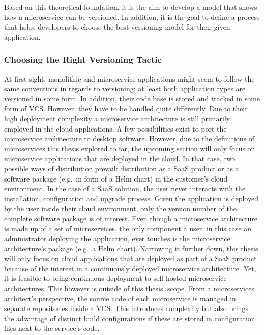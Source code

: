 Based on this theoretical foundation, it is the aim to develop a model that
shows how a microservice can be versioned. In addition, it is the goal to
define a process that helps developers to choose the best versioning model for
their given application.

\subsubsection{Choosing the Right Versioning Tactic}%
\label{ssub:Choosing_the_Right_Versioning_Tactic}

At first sight, monolithic and microservice applications might seem to follow
the same conventions in regards to versioning; at least both application types
are versioned in some form. In addition, their code base is stored and tracked
in some form of \ac{VCS}. However, they have to be handled quite differently.
Due to their high deployment complexity a microservice architecture is still
primarily employed in the cloud applications. A few possibilities exist to port
the microservice architecture to desktop software. However, due to the
definitions of microservices this thesis explored to far, the upcoming section
will only focus on microservice applications that are deployed in the cloud. In
that case, two possible ways of distribution prevail: distribution as a
\ac{SaaS} product or as a software package (e.g.\ in form of a Helm chart) in
the customer's cloud environment. In the case of a \ac{SaaS} solution, the user
never interacts with the installation, configuration and upgrade process. Given
the application is deployed by the user inside their cloud environment, only
the version number of the complete software package is of interest. Even though
a microservice architecture is made up of a set of microservices, the only
component a user, in this case an administrator deploying the application, ever
touches is the microservice architecture's package (e.g.\ a Helm chart).
Narrowing it further down, this thesis will only focus on cloud applications
that are deployed as part of a \ac{SaaS} product because of the interest in a
continuously deployed microservice architecture. Yet, it is feasible to bring
continuous deployment to self-hosted microservice architectures. This however
is outside of this thesis' scope. From a microservices architect's perspective,
the source code of each microservice is managed in separate repositories inside
a \ac{VCS}.  This introduces complexity but also brings the advantage of
distinct build configurations if these are stored in configuration files next
to the service's code.

